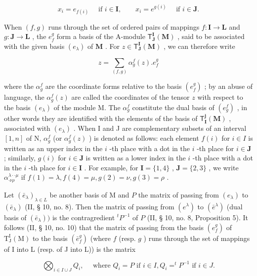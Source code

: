 \[
x _ {i} = e _ {f (i)} \quad \text { if } i \in \mathbf {I}, \qquad x _ {i} = e ^ {g (i)} \quad \text { if } i \in \mathbf {J}.
\]

When \((f, g)\) runs through the set of ordered pairs of mappings \(f: \mathbf{I} \to \mathbf{L}\) and \(g: \mathbf{J} \to \mathbf{L}\) , the \(e_f^g\) form a basis of the A-module \(\mathsf{T}_{\mathbf{J}}^{\mathbf{I}}(\mathbf{M})\) , said to be associated with the given basis \((e_{\lambda})\) of \(\mathbf{M}\) . For \(z \in \mathsf{T}_{\mathbf{J}}^{\mathbf{I}}(\mathbf{M})\) , we can therefore write

\[
z = \sum_ {(f, g)} \alpha_ {g} ^ {f} (z). e _ {f} ^ {g}\tag{12}
\]

where the \(\alpha_g^f\) are the coordinate forms relative to the basis \((e_f^g)\) ; by an abuse of language, the \(\alpha_g^f(z)\) are called the coordinates of the tensor \(z\) with respect to the basis \((e_\lambda)\) of the module M. The \(\alpha_g^f\) constitute the dual basis of \((e_g^f)\) , in other words they are identified with the elements of the basis of \(\mathsf{T}_{\mathbf{I}}^{\mathbf{j}}(\mathbf{M})\) , associated with \((e_\lambda)\) . When I and J are complementary subsets of an interval \([1,n]\) of N, \(\alpha_g^f\) (or \(\alpha_g^f(z)\) ) is denoted as follows: each element \(f(i)\) for \(i\in I\) is written as an upper index in the \(i\) -th place with a dot in the \(i\) -th place for \(i \in \mathbf{J}\) ; similarly, \(g(i)\) for \(i \in \mathbf{J}\) is written as a lower index in the \(i\) -th place with a dot in the \(i\) -th place for \(i \in \mathbf{I}\) . For example, for \(\mathbf{I} = \{1, 4\}\) , \(\mathbf{J} = \{2, 3\}\) , we write \(\alpha_{\cdot \nu \rho}^{\lambda \cdot \cdot \mu}\) if \(f(1) = \lambda, f(4) = \mu, g(2) = \nu, g(3) = \rho\) .

Let \((\bar{e}_{\lambda})_{\lambda \in L}\) be another basis of M and \(P\) the matrix of passing from \((e_{\lambda})\) to \((\bar{e}_{\lambda})\) (II, § 10, no. 8). Then the matrix of passing from \((e^{\lambda})\) to \((\bar{e}^{\lambda})\) (dual basis of \((\bar{e}_{\lambda}))\) is the contragredient \(^{t}P^{-1}\) of \(P\) (II, § 10, no. 8, Proposition 5). It follows (II, § 10, no. 10) that the matrix of passing from the basis \((e_{f}^{g})\) of \(\mathrm{T}_{\mathrm{J}}^{\mathrm{I}}(\mathrm{M})\) to the basis \((\bar{e}_{f}^{g})\) (where \(f\) (resp. \(g\) ) runs through the set of mappings of I into L (resp. of J into L)) is the matrix

\[
\bigotimes_ {i \in I \cup J} Q _ {i}, \quad \text { where } Q _ {i} = P \text { if } i \in I, Q _ {i} = ^ {t} P ^ {- 1} \text { if } i \in J.\tag{13}
\]

